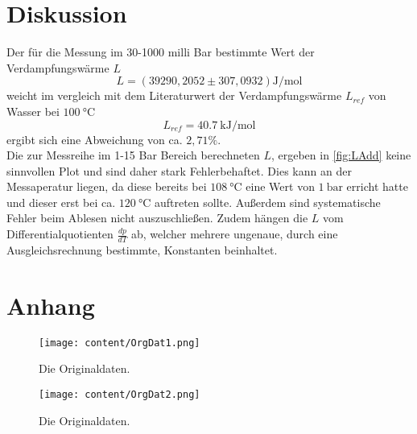 \section{Diskussion}
\label{sec:Diskussion}
Der für die Messung im 30-1000 milli Bar bestimmte Wert der Verdampfungswärme $L$
\begin{equation*}
    L = (39290,2052\pm 307,0932)\unit{\joule\per\mol}
\end{equation*}
weicht im vergleich mit dem Literaturwert der Verdampfungswärme $L_{ref}$ \cite{Chem} von Wasser bei $\SI{100}{\celsius}$
\begin{equation*}
    L_{ref} = \SI{40,7}{\kilo\joule\per\mol}
\end{equation*}
ergibt sich eine Abweichung von ca. $2,71\%$.\\
Die zur Messreihe im 1-15 Bar Bereich berechneten $L$, ergeben in \autoref{fig:LAdd} keine sinnvollen Plot und sind daher stark Fehlerbehaftet.
Dies kann an der Messaperatur liegen, da diese bereits bei $\SI{108}{\celsius}$ eine Wert von $\SI{1}{\bar}$ erricht hatte und dieser erst bei
ca. $\SI{120}{\celsius}$ auftreten sollte. Außerdem sind systematische Fehler beim Ablesen nicht auszuschließen.
Zudem hängen die $L$ vom Differentialquotienten $\frac{dp}{dT}$ ab, welcher mehrere ungenaue,
durch eine Ausgleichsrechnung bestimmte, Konstanten beinhaltet.
\section{Anhang}
\label{sec:Anhang}
\begin{figure}[H]
    \centering
    \texttt{[image: content/OrgDat1.png]}
    \caption{Die Originaldaten.}
    \label{fig:OrgDat1}
\end{figure}
\begin{figure}[H]
    \centering
    \texttt{[image: content/OrgDat2.png]}
    \caption{Die Originaldaten.}
    \label{fig:OrgDat2}
\end{figure}
